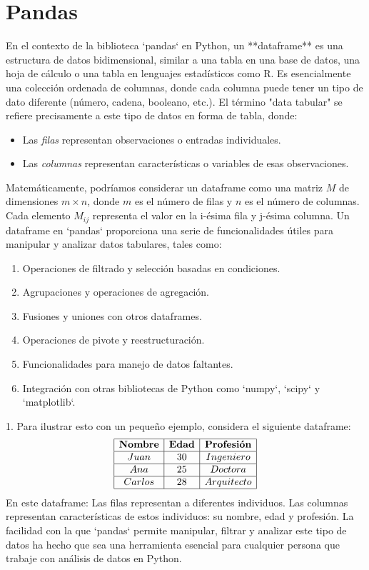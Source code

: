 \section{Pandas}
En el contexto de la biblioteca `pandas` en Python, un **dataframe** es una estructura de datos bidimensional, similar a una tabla en una base de datos, una hoja de cálculo o una tabla en lenguajes estadísticos como R. Es esencialmente una colección ordenada de columnas, donde cada columna puede tener un tipo de dato diferente (número, cadena, booleano, etc.).
El término "data tabular" se refiere precisamente a este tipo de datos en forma de tabla, donde:
\begin{itemize}
\item Las \textit{filas} representan observaciones o entradas individuales.
\item Las \textit{columnas} representan características o variables de esas observaciones.
\end{itemize}
Matemáticamente, podríamos considerar un dataframe como una matriz \( M \) de dimensiones \( m \times n \), donde \( m \) es el número de filas y \( n \) es el número de columnas. Cada elemento \( M_{ij} \) representa el valor en la i-ésima fila y j-ésima columna.
Un dataframe en `pandas` proporciona una serie de funcionalidades útiles para manipular y analizar datos tabulares, tales como:
\begin{enumerate}
\item Operaciones de filtrado y selección basadas en condiciones.
\item Agrupaciones y operaciones de agregación.
\item Fusiones y uniones con otros dataframes.
\item Operaciones de pivote y reestructuración.
\item Funcionalidades para manejo de datos faltantes.
\item  Integración con otras bibliotecas de Python como `numpy`, `scipy` y `matplotlib`.
\end{enumerate}1. 
Para ilustrar esto con un pequeño ejemplo, considera el siguiente dataframe:
\[
\begin{array}{|c|c|c|}
\hline
\textbf{Nombre} & \textbf{Edad} & \textbf{Profesión} \\
\hline
Juan & 30 & Ingeniero \\
\hline
Ana & 25 & Doctora \\
\hline
Carlos & 28 & Arquitecto \\
\hline
\end{array}
\]
En este dataframe:
Las filas representan a diferentes individuos.
Las columnas representan características de estos individuos: su nombre, edad y profesión.
La facilidad con la que `pandas` permite manipular, filtrar y analizar este tipo de datos ha hecho que sea una herramienta esencial para cualquier persona que trabaje con análisis de datos en Python.
